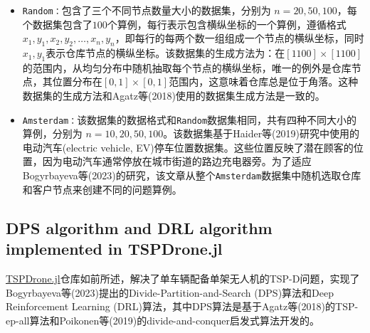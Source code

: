 \begin{itemize}
    \item \texttt{Random：}包含了三个不同节点数量大小的数据集，分别为 $n = 20, 50, 100$，每个数据集包含了$100$个算例，每行表示包含横纵坐标的一个算例，遵循格式 $x_1,y_1,x_2,y_2,\dots,x_n,y_n$，即每行的每两个数一组组成一个节点的横纵坐标，同时 $x_1,y_1$表示仓库节点的横纵坐标。该数据集的生成方法为：在$[1100]\times[1100]$的范围内，从均匀分布中随机抽取每个节点的横纵坐标，唯一的例外是仓库节点，其位置分布在$[0,1]\times[0,1]$范围内，这意味着仓库总是位于角落。这种数据集的生成方法和Agatz等(2018)\cite{agatzOptimizationApproachesTraveling2018}使用的数据集生成方法是一致的。
    \item \texttt{Amsterdam：}该数据集的数据格式和\texttt{Random}数据集相同，共有四种不同大小的算例，分别为 $n = 10, 20, 50, 100$。该数据集基于Haider等(2019)\cite{haiderOptimizingRelocationOperations2019}研究中使用的电动汽车(electric vehicle, EV)停车位置数据集。这些位置反映了潜在顾客的位置，因为电动汽车通常停放在城市街道的路边充电器旁。为了适应Bogyrbayeva等(2023)\cite{bogyrbayevaDeepReinforcementLearning2023}的研究，该文章从整个\texttt{Amsterdam}数据集中随机选取仓库和客户节点来创建不同的问题算例。
\end{itemize}

\subsection{DPS algorithm and DRL algorithm implemented in TSPDrone.jl}
\href{https://github.com/chkwon/TSPDrone.jl}{TSPDrone.jl}仓库如前所述，解决了单车辆配备单架无人机的TSP-D问题，实现了Bogyrbayeva等(2023)\cite{bogyrbayevaDeepReinforcementLearning2023}提出的Divide-Partition-and-Search (DPS)算法和Deep Reinforcement Learning (DRL)算法，其中DPS算法是基于Agatz等(2018)\cite{agatzOptimizationApproachesTraveling2018}的TSP-ep-all算法和Poikonen等(2019)\cite{poikonenBranchandBoundApproachTraveling2019}的divide-and-conquer启发式算法开发的。


